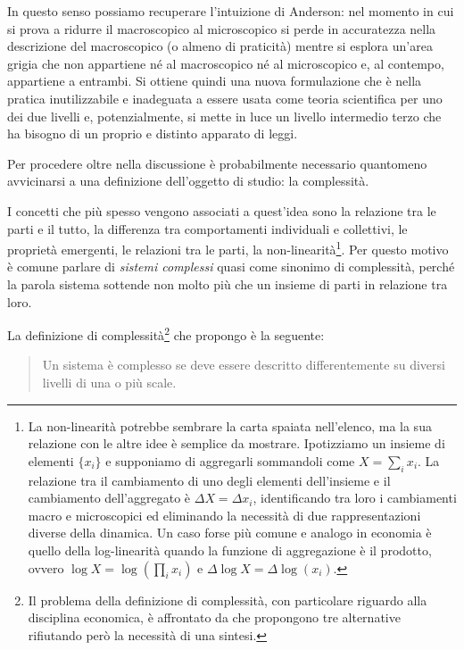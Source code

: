 \documentclass[a4paper, headings=standardclasses]{scrartcl}
\begin{document}
In questo senso possiamo recuperare l'intuizione di Anderson: nel momento in cui si prova a ridurre il macroscopico al microscopico si perde in accuratezza nella descrizione del macroscopico (o almeno di praticità) mentre si esplora un'area grigia che non appartiene né al macroscopico né al microscopico e, al contempo, appartiene a entrambi.
Si ottiene quindi una nuova formulazione che è nella pratica inutilizzabile e inadeguata a essere usata come teoria scientifica per uno dei due livelli e, potenzialmente, si mette in luce un livello intermedio terzo che ha bisogno di un proprio e distinto apparato di leggi.

Per procedere oltre nella discussione è probabilmente necessario quantomeno avvicinarsi a una definizione dell'oggetto di studio: la complessità.

I concetti che più spesso vengono associati a quest'idea sono la relazione tra le parti e il tutto, la differenza tra comportamenti individuali e collettivi, le proprietà emergenti, le relazioni tra le parti, la non-linearità\footnote{La non-linearità potrebbe sembrare la carta spaiata nell'elenco, ma la sua relazione con le altre idee è semplice da mostrare. Ipotizziamo un insieme di elementi $\{x_i\}$ e supponiamo di aggregarli sommandoli come $X=\sum_i x_i$. La relazione tra il cambiamento di uno degli elementi dell'insieme e il cambiamento dell'aggregato è $\Delta X=\Delta x_i$, identificando tra loro i cambiamenti macro e microscopici ed eliminando la necessità di due rappresentazioni diverse della dinamica. Un caso forse più comune e analogo in economia è quello della log-linearità quando la funzione di aggregazione è il prodotto, ovvero $\log X = \log(\prod_i x_i)$ e $\Delta \log X=\Delta\log(x_i)$.}. Per questo motivo è comune parlare di \textit{sistemi complessi} quasi come sinonimo di complessità, perché la parola sistema sottende non molto più che un insieme di parti in relazione tra loro.

La definizione di complessità\footnote{Il problema della definizione di complessità, con particolare riguardo alla disciplina economica, è affrontato da \textcite[§3][]{holt2011} che propongono tre alternative rifiutando però la necessità di una sintesi.} che propongo è la seguente:
\begin{quote}
	Un sistema è complesso se deve essere descritto differentemente su diversi livelli di una o più scale.
\end{quote}
\end{document}
